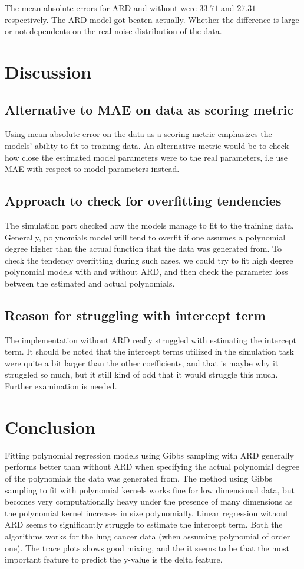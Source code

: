 \documentclass[12pt]{article}
\begin{document}
    The mean absolute errors for ARD and without were $33.71$ and $27.31$ respectively. The ARD model got beaten actually. Whether the difference is large or not dependents on the real noise distribution of the data.

    \section{Discussion}
        \subsection{Alternative to MAE on data as scoring metric}
        Using mean absolute error on the data as a scoring metric emphasizes the models' ability to fit to training data. An alternative metric would be to check how close the estimated model parameters were to the real parameters, i.e use MAE with respect to model parameters instead.

        \subsection{Approach to check for overfitting tendencies}
        The simulation part checked how the models manage to fit to the training data. Generally, polynomials model will tend to overfit if one assumes a polynomial degree higher than the actual function that the data was generated from. To check the tendency overfitting during such cases, we could try to fit high degree polynomial models with and without ARD, and then check the parameter loss between the estimated and actual polynomials.

        \subsection{Reason for struggling with intercept term}
        The implementation without ARD really struggled with estimating the intercept term. It should be noted that the intercept terms utilized in the simulation task were quite a bit larger than the other coefficients, and that is maybe why it struggled so much, but it still kind of odd that it would struggle this much. Further examination is needed.   

    \section{Conclusion}
    Fitting polynomial regression models using Gibbs sampling with ARD generally performs better than without ARD when specifying the actual polynomial degree of the polynomials the data was generated from. The method using Gibbs sampling to fit with polynomial kernels works fine for low dimensional data, but becomes very computationally heavy under the presence of many dimensions as the polynomial kernel increases in size polynomially. Linear regression without ARD seems to significantly struggle to estimate the intercept term. Both the algorithms works for the lung cancer data (when assuming polynomial of order one). The trace plots shows good mixing, and the it seems to be that the most important feature to predict the y-value is the delta feature.  
\end{document}
